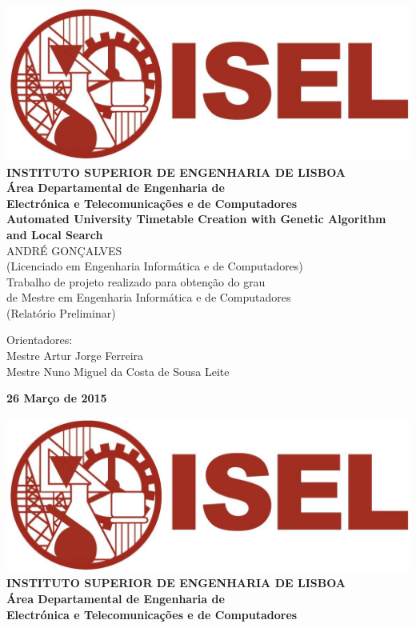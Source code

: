 \begin{titlepage}
	\thispagestyle{empty}
	\begin{center}
		\includegraphics[width=5 cm]{./images/isel_logo.jpg} \\[0.5cm]
		{\Large \textbf{INSTITUTO SUPERIOR DE ENGENHARIA DE LISBOA}} \\[0.5cm]
		{\Large \textbf{Área Departamental de Engenharia de \\Electrónica e Telecomunica\c cões e de Computadores}} \\[0.8cm]		
		\fontsize{18pt}{10pt}\selectfont
		{\textbf{Automated University Timetable Creation with Genetic Algorithm and Local Search}} \\[0.8cm]
		\fontsize{16pt}{10pt}\selectfont
		ANDRÉ GONÇALVES\\[0.2cm]
		\fontsize{14pt}{10pt}\selectfont
		(Licenciado em Engenharia Informática e de Computadores)\\[0.8cm]
		\fontsize{12pt}{10pt}\selectfont
		{Trabalho de projeto realizado para obten\c cão do grau\\de Mestre em Engenharia Informática e de Computadores} \\[0.8cm]
		\fontsize{14pt}{10pt}\selectfont
		(Relatório Preliminar)\\[0.8cm]
		\fontsize{12pt}{10pt}\selectfont
		\vfill
		\begin{tabbing}
		   \fontsize{12pt}{10pt}\selectfont
		   Orientadores: \\
		   \fontsize{11pt}{10pt}\selectfont
		   \hspace{1.1cm}Mestre Artur Jorge Ferreira \\
		   \fontsize{11pt}{10pt}\selectfont
		   \hspace{1.1cm}Mestre Nuno Miguel da Costa de Sousa Leite \\
		\end{tabbing}
		
		
		\fontsize{10pt}{10pt}\selectfont
		\textbf{26 Março de 2015}
	\end{center}
	
	\newpage
	\thispagestyle{empty}
	\cleardoublepage
	\newpage
	\thispagestyle{empty}
	
	\begin{center}
		\includegraphics[width=5 cm]{./images/isel_logo.jpg} \\[0.5cm]
		{\Large \textbf{INSTITUTO SUPERIOR DE ENGENHARIA DE LISBOA}} \\[0.5cm]
		{\Large \textbf{Área Departamental de Engenharia de \\Electrónica e Telecomunica\c cões e de Computadores}} \\[0.8cm]		
		

\end{center}
\end{titlepage}

